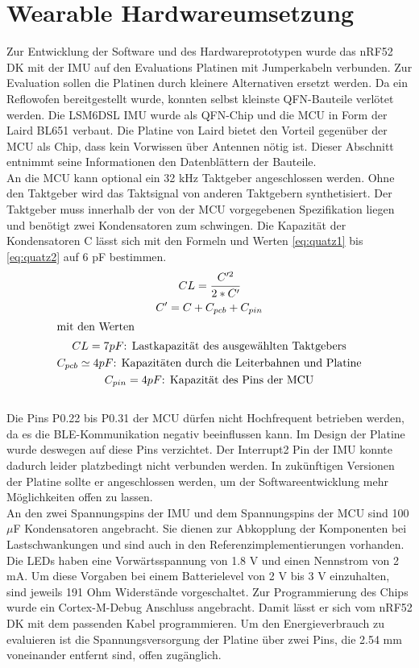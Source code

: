 \section{Wearable Hardwareumsetzung}
Zur Entwicklung der Software und des Hardwareprototypen wurde das nRF52 DK mit der IMU auf den Evaluations Platinen mit Jumperkabeln verbunden.
Zur Evaluation sollen die Platinen durch kleinere Alternativen ersetzt werden.
Da ein Reflowofen bereitgestellt wurde, konnten selbst kleinste QFN-Bauteile verlötet werden.
Die LSM6DSL IMU wurde als QFN-Chip und die MCU in Form der Laird BL651 verbaut.
Die Platine von Laird bietet den Vorteil gegenüber der MCU als Chip, dass kein Vorwissen über Antennen nötig ist.
Dieser Abschnitt entnimmt seine Informationen den Datenblättern der Bauteile.\\
An die MCU kann optional ein 32 kHz Taktgeber angeschlossen werden.
Ohne den Taktgeber wird das Taktsignal von anderen Taktgebern synthetisiert.
Der Taktgeber muss innerhalb der von der MCU vorgegebenen Spezifikation liegen und benötigt zwei Kondensatoren zum schwingen.
Die Kapazität der Kondensatoren C lässt sich mit den Formeln und Werten \ref{eq:quatz1} bis \ref{eq:quatz2} auf 6 pF bestimmen.
\begin{gather}
  \label{eq:quatz1}
	CL = \cfrac{C'^2}{2*C'}\\
	C' = C + C_{pcb} + C_{pin}\\
\intertext{mit den Werten}
	CL = 7 pF\text{: Lastkapazität des ausgewählten Taktgebers}\\
	C_{pcb} \simeq 4 pF\text{: Kapazitäten durch die Leiterbahnen und Platine}\\
  \label{eq:quatz2}
	C_{pin} = 4 pF\text{: Kapazität des Pins der MCU}
\end{gather}\\
Die Pins P0.22 bis P0.31 der MCU dürfen nicht Hochfrequent betrieben werden, da es die BLE-Kommunikation negativ beeinflussen kann.
Im Design der Platine wurde deswegen auf diese Pins verzichtet.
Der Interrupt2 Pin der IMU konnte dadurch leider platzbedingt nicht verbunden werden.
In zukünftigen Versionen der Platine sollte er angeschlossen werden, um der Softwareentwicklung mehr Möglichkeiten offen zu lassen.\\
An den zwei Spannungspins der IMU und dem Spannungspins der MCU sind 100 $\mu$F Kondensatoren angebracht.
Sie dienen zur Abkopplung der Komponenten bei Lastschwankungen und sind auch in den Referenzimplementierungen vorhanden.
Die LEDs haben eine Vorwärtsspannung von 1.8 V und einen Nennstrom von 2 mA.
Um diese Vorgaben bei einem Batterielevel von 2 V bis 3 V einzuhalten, sind jeweils 191 Ohm Widerstände vorgeschaltet.
Zur Programmierung des Chips wurde ein Cortex-M-Debug Anschluss angebracht.
Damit lässt er sich vom nRF52 DK mit dem passenden Kabel programmieren.
Um den Energieverbrauch zu evaluieren ist die Spannungsversorgung der Platine über zwei Pins, die 2.54 mm voneinander entfernt sind, offen zugänglich.\\


